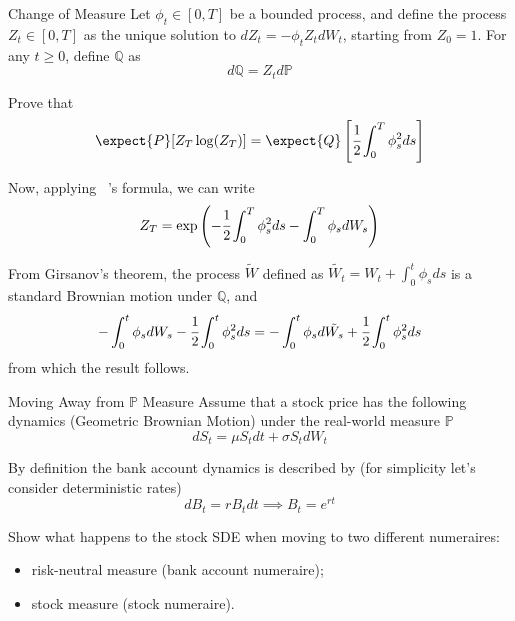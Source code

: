 \documentclass{beamer}
\begin{document}
\begin{frame}{}
\begin{block}{Change of Measure}
Let $\phi_t \in [0, T]$ be a bounded process, and define the process $Z_t \in [0,T]$ as the unique solution to $dZ_t = -\phi_t Z_t dW_t$, starting from $Z_0 = 1$. For any $t \ge 0$, define $\mathbb{Q}$ as
\begin{equation*}
d\mathbb{Q} = Z_t d\mathbb{P}
\end{equation*}

Prove that
\begin{equation*}
\expect{P}[Z_T \log(Z_T)]=\expect{Q}\left[\cfrac{1}{2}\int_0^T\phi^2_s ds\right]
\end{equation*}
\end{block}
\end{frame}

\begin{frame}{}
Now, applying \ito~'s formula, we can write
\begin{equation*}
Z_T = \exp\left(-\cfrac{1}{2}\int_0^T\phi^2_s ds -\int_0^T\phi_s dW_s\right)
\end{equation*}

From Girsanov’s theorem, the process $\tilde{W}$ defined as $\tilde{W_t} = W_t + \int_0^t \phi_s ds$ is a standard Brownian motion under $\mathbb{Q}$, and
\begin{equation*}
-\int_0^t\phi_s dW_s -\cfrac{1}{2}\int_0^t\phi^2_s ds = -
\int_0^t\phi_s d\tilde{W_s} + \cfrac{1}{2}\int_0^t\phi^2_s ds
\end{equation*}
from which the result follows.
\end{frame}

\begin{frame}{}
\begin{block}{Moving Away from $\mathbb{P}$ Measure}
Assume that a stock price has the following dynamics (Geometric Brownian Motion) under the real-world measure $\mathbb{P}$
\begin{equation*}
dS_t = \mu S_t dt + \sigma S_t dW_t
\end{equation*}

By definition the bank account dynamics is described by (for simplicity let's consider deterministic rates)
\begin{equation*}
dB_t = rB_tdt\implies B_t = e^{rt}
\end{equation*}

Show what happens to the stock SDE when moving to two different numeraires:
\begin{itemize}
\item risk-neutral measure (bank account numeraire);
\item stock measure (stock numeraire).
\end{itemize}
\end{block}
\end{frame}
\end{document}

